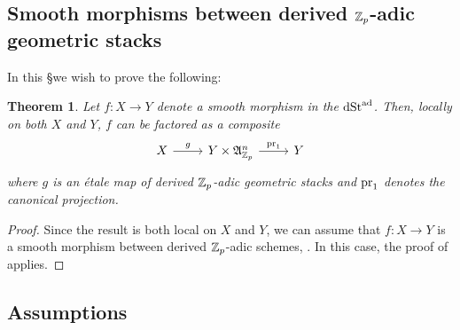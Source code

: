 \documentclass[10pt,a4paper]{amsart}
\numberwithin{equation}{subsection}
\newtheorem{theorem}{Theorem}[subsection]
\theoremstyle{definition}
\begin{document}
\subsection{Smooth morphisms between derived $\mathbb Z_p$-adic geometric stacks}

In this \S we wish to prove the following:

\begin{theorem}
    Let $f \colon X \to Y$ denote a smooth morphism in the \infcat $\mathrm{dSt}^{\mathrm{ad}}$. Then, locally on both $X$ and $Y$, $f$ can be factored as a composite
        \[
        \begin{tikzcd}
                X \ar{r}{g} & Y \times \fA^n_{\bZp} \ar{r}{\mathrm{pr}_1} & Y
        \end{tikzcd}
        \]
    where $g$ is an \'etale map of derived $\mathbb Z_p$-adic geometric stacks and $\mathrm{pr}_1$ denotes the canonical projection.
\end{theorem}

\begin{proof}
    Since the result is both local on $X$ and $Y$, we can assume that $f \colon X \to Y$ is a smooth morphism between derived $\mathbb Z_p$-adic schemes, . In this case, the proof of \cite[Proposition 5.50]{porta2017representability} applies. 
\end{proof}

\subsection{Assumptions}
\end{document}
